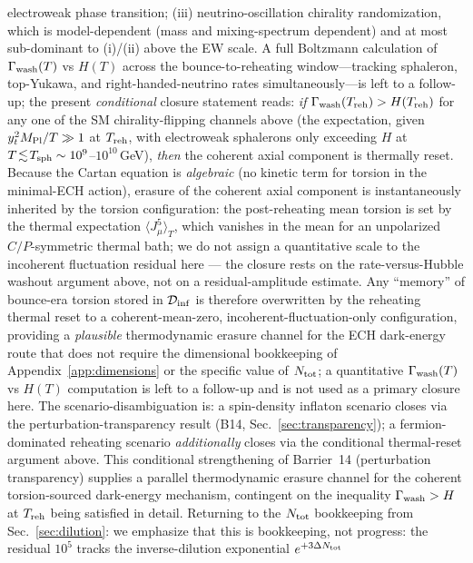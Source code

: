 \documentclass[aps,prd,twocolumn,superscriptaddress,showpacs,preprintnumbers,nofootinbib,longbibliography,floatfix]{revtex4-2}
\newcommand{\Dinf}{\mathcal{D}_{\rm inf}}
\begin{document}
electroweak phase transition;
(iii) neutrino-oscillation chirality randomization, which is
model-dependent (mass and mixing-spectrum dependent) and at most
sub-dominant to (i)/(ii) above the EW scale. A full Boltzmann calculation of
$\Gamma_{\rm wash}(T)$ vs $H(T)$ across the bounce-to-reheating
window---tracking sphaleron, top-Yukawa, and right-handed-neutrino
rates simultaneously---is left to a follow-up; the present
\emph{conditional} closure statement reads: \emph{if}
$\Gamma_{\rm wash}(T_{\rm reh})>H(T_{\rm reh})$ for any one of the SM
chirality-flipping channels above (the expectation, given
$y_t^2 M_{\rm Pl}/T\gg 1$ at $T_{\rm reh}$, with electroweak
sphalerons only exceeding $H$ at
$T\!\lesssim\!T_{\rm sph}\sim 10^{9}$--$10^{10}\,$GeV), \emph{then} the
coherent axial component is thermally reset. Because the Cartan equation is
\emph{algebraic} (no kinetic term for torsion in the minimal-ECH
action), erasure of the coherent axial component is instantaneously
inherited by the torsion configuration: the post-reheating mean
torsion is set by the thermal expectation $\langle J^5_\mu\rangle_T$,
which vanishes in the mean for an unpolarized $C/P$-symmetric thermal
bath; we do not assign a quantitative scale to the incoherent
fluctuation residual here --- the closure rests on the
rate-versus-Hubble washout argument above, not on a residual-amplitude
estimate.
Any ``memory'' of bounce-era torsion stored in $\Dinf$ is therefore
overwritten by the reheating thermal reset to a coherent-mean-zero,
incoherent-fluctuation-only configuration, providing a
\emph{plausible} thermodynamic erasure channel for the ECH
dark-energy route that does not require the dimensional bookkeeping of
Appendix~\ref{app:dimensions} or the specific value of $N_{\rm tot}$;
a quantitative $\Gamma_{\rm wash}(T)$ vs $H(T)$ computation is left
to a follow-up and is not used as a primary closure here. The
scenario-disambiguation is: a spin-density inflaton scenario closes
via the perturbation-transparency result (B14, Sec.~\ref{sec:transparency});
a fermion-dominated reheating scenario \emph{additionally} closes via
the conditional thermal-reset argument above. This conditional
strengthening of Barrier~14 (perturbation transparency) supplies a
parallel thermodynamic erasure channel for the coherent torsion-sourced
dark-energy mechanism, contingent on the inequality
$\Gamma_{\rm wash}>H$ at $T_{\rm reh}$ being satisfied in detail.
Returning to the $N_{\rm tot}$ bookkeeping from Sec.~\ref{sec:dilution}:
we emphasize that this is bookkeeping, not progress: the residual
$10^5$ tracks the inverse-dilution exponential $e^{+3\Delta N_{\rm tot}}$
\end{document}
